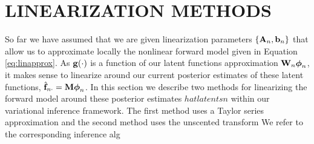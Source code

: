 \section{LINEARIZATION METHODS}
So far we have assumed that we are given linearization parameters $\{\mathbf{A}_n, \mathbf{b}_n\}$ that allow us to 
approximate locally the nonlinear forward model given in Equation   \eqref{eq:linapprox}. As 
$\mathbf{g}\!\left({{\cdot}}\right)$  is a function of our latent functions approximation ${\mathbf{W}_n\boldsymbol\phi_n}$,  
it makes sense to linearize around our current posterior estimates of these latent functions, 
$\hat{\mathbf{f}}_{n \cdot} =\mathbf{M} \boldsymbol\phi_n$. In this section we describe two methods for linearizing 
the  forward model around these posterior estimates $hatlatentsn$ within our variational 
inference framework. The first method uses a Taylor series approximation and the second 
method uses the unscented transform We refer to the corresponding inference alg


~\cite{Geist2010}
 \cite{Julier2004}